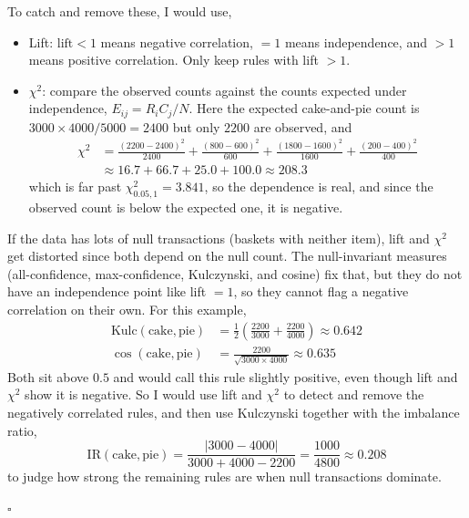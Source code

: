 \documentclass[12pt,letterpaper, onecolumn]{exam}
\begin{document}
\begin{questions}
\begin{solution}
        To catch and remove these, I would use,
        \begin{itemize}
            \item Lift: $\text{lift}<1$ means negative correlation, $=1$ means independence, and $>1$ means positive correlation. Only keep rules with lift $>1$.
            \item $\chi^2$: compare the observed counts against the counts expected under independence, $E_{ij}=R_iC_j/N$. Here the expected cake-and-pie count is $3000\times4000/5000=2400$ but only $2200$ are observed, and
            \begin{align*}
                \chi^2 &= \frac{(2200-2400)^2}{2400}+\frac{(800-600)^2}{600}+\frac{(1800-1600)^2}{1600}+\frac{(200-400)^2}{400} \\
                &\approx 16.7 + 66.7 + 25.0 + 100.0 \approx 208.3
            \end{align*}
            which is far past $\chi^2_{0.05,1}=3.841$, so the dependence is real, and since the observed count is below the expected one, it is negative.
        \end{itemize}
        If the data has lots of null transactions (baskets with neither item), lift and $\chi^2$ get distorted since both depend on the null count. The null-invariant measures (all-confidence, max-confidence, Kulczynski, and cosine) fix that, but they do not have an independence point like lift $=1$, so they cannot flag a negative correlation on their own. For this example,
        \begin{align*}
            \text{Kulc}(\text{cake},\text{pie}) &= \frac{1}{2}\left(\frac{2200}{3000}+\frac{2200}{4000}\right) \approx 0.642 \\
            \cos(\text{cake},\text{pie}) &= \frac{2200}{\sqrt{3000\times4000}} \approx 0.635
        \end{align*}
        Both sit above $0.5$ and would call this rule slightly positive, even though lift and $\chi^2$ show it is negative. So I would use lift and $\chi^2$ to detect and remove the negatively correlated rules, and then use Kulczynski together with the imbalance ratio,
        \begin{equation*}
            \text{IR}(\text{cake},\text{pie}) = \frac{|3000-4000|}{3000+4000-2200} = \frac{1000}{4800} \approx 0.208
        \end{equation*}
        to judge how strong the remaining rules are when null transactions dominate.

        $\square$
    \end{solution}


\end{questions}
\end{document}
